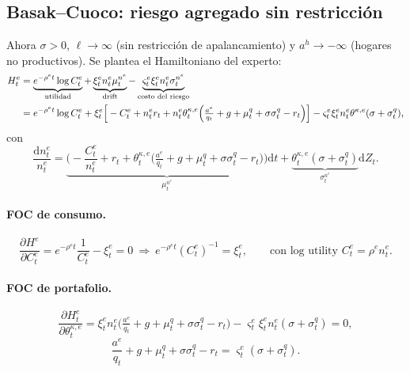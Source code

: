 \documentclass[11pt]{article}
\theoremstyle{definition}
\theoremstyle{remark}
\newcommand{\dd}{\mathrm{d}}
\newcommand{\aE}{a^{e}}
\newcommand{\aH}{a^{h}}
\newcommand{\re}{\rho^{e}}
\newcommand{\thke}{\theta_t^{\kappa,e}}
\newcommand{\vsig}{\varsigma}
\newcommand{\sq}{\sigma_t^{q}}
\begin{document}
\subsection{Basak--Cuoco: riesgo agregado sin restricción}

Ahora $\sigma>0$, $\ell\to\infty$ (sin restricción de apalancamiento) y $\aH\to-\infty$ (hogares no productivos). Se plantea el Hamiltoniano del experto:
\begin{align}
H_t^{e}&=\underbrace{e^{-\re t}\log C_t^{e}}_{\text{utilidad}}
+\underbrace{\xi_t^{e}n_t^{e}\mu_t^{n^{e}}}_{\text{drift}}
-\underbrace{\vsig_t^{e}\xi_t^{e}n_t^{e}\sigma_t^{n^{e}}}_{\text{costo del riesgo}}\notag\\
&=e^{-\re t}\log C_t^{e}
+\xi_t^{e}\Big[-C_t^{e}+n_t^{e}r_t+n_t^{e}\thke\Big(\tfrac{\aE}{q_t}+g+\mu_t^{q}+\sigma\sq-r_t\Big)\Big]
-\vsig_t^{e}\xi_t^{e}n_t^{e}\theta^{\kappa,e}(\sigma+\sq),
\end{align}
con
\[
\frac{\dd n_t^{e}}{n_t^{e}}=\underbrace{\Big(-\frac{C_t^{e}}{n_t^{e}}+r_t+\thke\big(\tfrac{\aE}{q_t}+g+\mu_t^{q}+\sigma\sq-r_t\big)\Big)}_{\mu_t^{n^{e}}}\dd t
+\underbrace{\thke(\sigma+\sq)}_{\sigma_t^{n^{e}}}\dd Z_t.
\]

\paragraph{FOC de consumo.}
\[
\frac{\partial H^{e}}{\partial C_t^{e}}=e^{-\re t}\frac{1}{C_t^{e}}-\xi_t^{e}=0
\ \Rightarrow\ e^{-\re t}(C_t^{e})^{-1}=\xi_t^{e},
\qquad\text{con log utility } C_t^{e}=\re n_t^{e}.
\]

\paragraph{FOC de portafolio.}
\[
\frac{\partial H_t^{e}}{\partial\thke}
=\xi_t^{e}n_t^{e}\Big(\tfrac{\aE}{q_t}+g+\mu_t^{q}+\sigma\sq-r_t\Big)-\vsig_t^{e}\xi_t^{e}n_t^{e}(\sigma+\sq)=0,
\]
\begin{equation}\label{eq:bc-portfolio}
\boxed{\ \frac{\aE}{q_t}+g+\mu_t^{q}+\sigma\sq-r_t=\vsig_t^{e}(\sigma+\sq).\ }
\end{equation}
\end{document}
